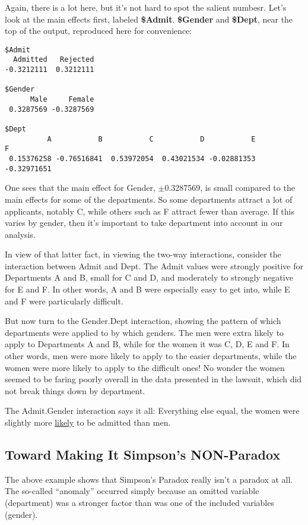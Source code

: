 Again, there is a lot here, but it's not hard to spot the salient
numbesr.  Let's look at the main effects first, labeled {\bf \$Admit}.
{\bf \$Gender} and {\bf \$Dept}, near the top of the output, reproduced
here for convenience:

\begin{lstlisting}
$Admit
  Admitted   Rejected 
-0.3212111  0.3212111 

$Gender
      Male     Female 
 0.3287569 -0.3287569 

$Dept
          A           B           C           D           E           F 
 0.15376258 -0.76516841  0.53972054  0.43021534 -0.02881353 -0.32971651 
\end{lstlisting}

One sees that the main effect for Gender, $\pm$0.3287569, is small
compared to the main effects for some of the departments.  So some
departments attract a lot of applicants, notably C, while others such as
F attract fewer than average.  If this varies by gender, then it's
important to take department into account in our analysis.



In view of that latter fact, in viewing the two-way interactions,
consider the interaction between Admit and Dept.  The Admit values were
strongly positive for Departments A and B, small for C and D, and
moderately to strongly negative for E and F.  In other words, A and B
were especially easy to get into, while E and F were particularly
difficult.

But now turn to the Gender.Dept interaction, showing the pattern of
which departments were applied to by which genders.  The men were extra
likely to apply to Departments A and B, while for the women it was C, D,
E and F.  In other words, men were more likely to apply to the easier
departments, while the women were more likely to apply to the difficult
ones!  No wonder the women seemed to be faring poorly overall in the
data presented in the lawsuit, which did not break things down by
department.

The Admit.Gender interaction says it all:  Everything else equal, the
women were slightly more \underline{likely} to be admitted than men.

\subsection{Toward Making It Simpson's NON-Paradox}

The above example shows that Simpson's Paradox really isn't a paradox at
all.  The so-called ``anomaly'' occurred simply because an omitted
variable (department) was a stronger factor than was one of the included
variables (gender).

